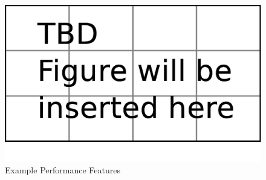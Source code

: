 \begin{figure}[tp]
   \begin{center}
      \includegraphics[width=\textwidth]{fig/TBDFigure}
   \end{center}
   \caption{Example Performance Features}
   \label{fig:expPerfFeat}
\end{figure}

